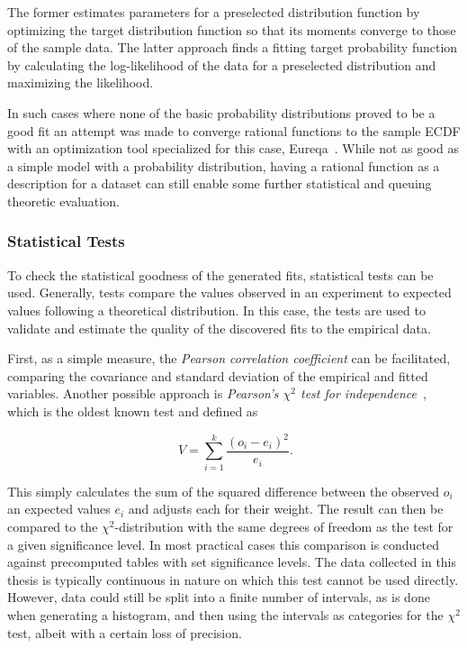 The former estimates parameters for a preselected distribution function by optimizing the target distribution function so that its moments converge to those of the sample data. The latter approach finds a fitting target probability function by calculating the log-likelihood of the data for a preselected distribution and maximizing the likelihood.

In such cases where none of the basic probability distributions proved to be a good fit an attempt was made to converge rational functions to the sample \gls{ECDF} with an optimization tool specialized for this case, Eureqa~\cite{eureqa_software, eureqa_paper}. While not as good as a simple model with a probability distribution, having a rational function as a description for a dataset can still enable some further statistical and queuing theoretic evaluation.


\subsubsection{Statistical Tests}

To check the statistical goodness of the generated fits, statistical tests can be used. Generally, tests compare the values observed in an experiment to expected values following a theoretical distribution. In this case, the tests are used to validate and estimate the quality of the discovered fits to the empirical data.

First, as a simple measure, the \textit{Pearson correlation coefficient} can be facilitated, comparing the covariance and standard deviation of the empirical and fitted variables. Another possible approach is \textit{Pearson's $\chi^2$ test for independence}~\cite{doi:10.1080/14786440009463897}, 
which is the oldest known test and defined as

\begin{equation}
	\phantom{.}V=\sum_{i=1}^{k} \frac{{(o_i - e_i)}^2}{e_i}\text{.}
\end{equation}

This simply calculates the sum of the squared difference between the observed $o_i$ an expected values $e_i$ and adjusts each for their weight. The result can then be compared to the $\chi^2$-distribution with the same degrees of freedom
as the test for a given significance level. In most practical cases this comparison is conducted against precomputed tables with set significance levels. The data collected in this thesis is typically continuous in nature 
on which this test cannot be used directly. However, data could still be split into a finite number of intervals, as is done when generating a histogram, and then using the intervals as categories for the $\chi^2$ test, albeit with a certain loss of precision.

